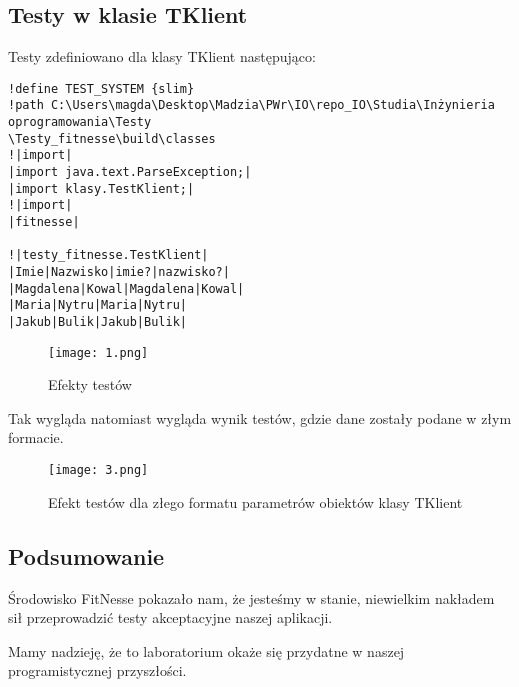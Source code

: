 \documentclass{article}
\begin{document}
\subsection{Testy w klasie TKlient}
Testy zdefiniowano dla klasy TKlient następująco:
\begin{verbatim}
!define TEST_SYSTEM {slim}
!path C:\Users\magda\Desktop\Madzia\PWr\IO\repo_IO\Studia\Inżynieria oprogramowania\Testy
\Testy_fitnesse\build\classes
!|import|
|import java.text.ParseException;|
|import klasy.TestKlient;|
!|import|
|fitnesse|

!|testy_fitnesse.TestKlient|
|Imie|Nazwisko|imie?|nazwisko?|
|Magdalena|Kowal|Magdalena|Kowal|
|Maria|Nytru|Maria|Nytru|
|Jakub|Bulik|Jakub|Bulik|
\end{verbatim}
\newpage
	\begin{figure}[!ht]
	\centering
	\texttt{[image: 1.png]}
	\caption{Efekty testów}
	\label{fig:obrazek 2}
	\newpage
\end{figure}
Tak wygląda natomiast wygląda wynik testów, gdzie dane zostały podane w złym formacie.
	\begin{figure}[!ht]
	\centering
	\texttt{[image: 3.png]}
	\caption{Efekt testów dla złego formatu parametrów obiektów klasy TKlient}
	\label{fig:obrazek 3}
	\newpage
\end{figure}
\subsection{Podsumowanie}
Środowisko FitNesse pokazało nam, że jesteśmy w stanie, niewielkim nakładem sił przeprowadzić testy akceptacyjne naszej aplikacji. 

Mamy nadzieję, że to laboratorium okaże się przydatne w naszej programistycznej przyszłości. 
\end{document}
